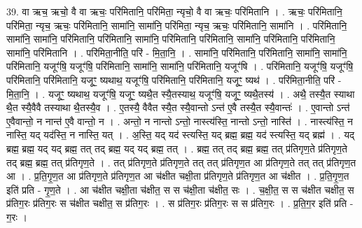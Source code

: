 \documentclass[17pt]{extarticle}
\begin{document}
39. वा ऋच॒ ऋचो॒ वै वा ऋचः॒ परि॑मितानि॒ परि॑मिता॒ न्यृचो॒ वै वा ऋचः॒ परि॑मितानि । . ऋचः॒ परि॑मितानि॒ परि॑मिता॒ न्यृच॒ ऋचः॒ परि॑मितानि॒ सामा॑नि॒ सामा॑नि॒ परि॑मिता॒ न्यृच॒ ऋचः॒ परि॑मितानि॒ सामा॑नि । . परि॑मितानि॒ सामा॑नि॒ सामा॑नि॒ परि॑मितानि॒ परि॑मितानि॒ सामा॑नि॒ परि॑मितानि॒ परि॑मितानि॒ सामा॑नि॒ परि॑मितानि॒ परि॑मितानि॒ सामा॑नि॒ परि॑मितानि । . परि॑मिता॒नीति॒ परि॑ - मि॒ता॒नि॒ । . सामा॑नि॒ परि॑मितानि॒ परि॑मितानि॒ सामा॑नि॒ सामा॑नि॒ परि॑मितानि॒ यजूꣳ॑षि॒ यजूꣳ॑षि॒ परि॑मितानि॒ सामा॑नि॒ सामा॑नि॒ परि॑मितानि॒ यजूꣳ॑षि । . परि॑मितानि॒ यजूꣳ॑षि॒ यजूꣳ॑षि॒ परि॑मितानि॒ परि॑मितानि॒ यजूꣳ॒॒ ष्यथाथ॒ यजूꣳ॑षि॒ परि॑मितानि॒ परि॑मितानि॒ यजूꣳ॒॒ ष्यथ॑ । . परि॑मिता॒नीति॒ परि॑ - मि॒ता॒नि॒ । . यजूꣳ॒॒ ष्यथाथ॒ यजूꣳ॑षि॒ यजूꣳ॒॒ ष्यथै॒त स्यै॒तस्याथ॒ यजूꣳ॑षि॒ यजूꣳ॒॒ ष्यथै॒तस्य॑ । . अथै॒ तस्यै॒त स्याथा थै॒त स्यै॒वैवै तस्याथा थै॒तस्यै॒व । . ए॒तस्यै॒ वैवैत स्यै॒त स्यै॒वान्तो ऽन्त॑ ए॒वै तस्यै॒त स्यै॒वान्तः॑ । . ए॒वान्तो ऽन्त॑ ए॒वैवान्तो॒ न नान्त॑ ए॒वै वान्तो॒ न । . अन्तो॒ न नान्तो ऽन्तो॒ नास्त्य॑स्ति॒ नान्तो ऽन्तो॒ नास्ति॑ । . नास्त्य॑स्ति॒ न नास्ति॒ यद् यद॑स्ति॒ न नास्ति॒ यत् । . अ॒स्ति॒ यद् यद॑ स्त्यस्ति॒ यद् ब्रह्म॒ ब्रह्म॒ यद॑ स्त्यस्ति॒ यद् ब्रह्म॑ । . यद् ब्रह्म॒ ब्रह्म॒ यद् यद् ब्रह्म॒ तत् तद् ब्रह्म॒ यद् यद् ब्रह्म॒ तत् । . ब्रह्म॒ तत् तद् ब्रह्म॒ ब्रह्म॒ तत् प्र॑तिगृण॒ते प्र॑तिगृण॒ते तद् ब्रह्म॒ ब्रह्म॒ तत् प्र॑तिगृण॒ते । . तत् प्र॑तिगृण॒ते प्र॑तिगृण॒ते तत् तत् प्र॑तिगृण॒त आ प्र॑तिगृण॒ते तत् तत् प्र॑तिगृण॒त आ । . प्र॒ति॒गृ॒ण॒त आ प्र॑तिगृण॒ते प्र॑तिगृण॒त आ च॑क्षीत चक्षी॒ता प्र॑तिगृण॒ते प्र॑तिगृण॒त आ च॑क्षीत । . प्र॒ति॒गृ॒ण॒त इति॑ प्रति - गृ॒ण॒ते । . आ च॑क्षीत चक्षी॒ता च॑क्षीत॒ स स च॑क्षी॒ता च॑क्षीत॒ सः । . च॒क्षी॒त॒ स स च॑क्षीत चक्षीत॒ स प्र॑तिग॒रः प्र॑तिग॒रः स च॑क्षीत चक्षीत॒ स प्र॑तिग॒रः । . स प्र॑तिग॒रः प्र॑तिग॒रः स स प्र॑तिग॒रः । . प्र॒ति॒ग॒र इति॑ प्रति - ग॒रः । \newline
\pagebreak
{}
\end{document}
